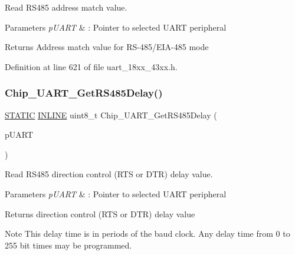 Read R\+S485 address match value. 


\begin{DoxyParams}{Parameters}
{\em p\+U\+A\+RT} & \+: Pointer to selected U\+A\+RT peripheral \\
\hline
\end{DoxyParams}
\begin{DoxyReturn}{Returns}
Address match value for R\+S-\/485/\+E\+I\+A-\/485 mode 
\end{DoxyReturn}


Definition at line 621 of file uart\+\_\+18xx\+\_\+43xx.\+h.

\mbox{\label{group___u_a_r_t__18_x_x__43_x_x_ga5394200f985c69d25fd0c7434588cf88}} 
\subsubsection{\texorpdfstring{Chip\+\_\+\+U\+A\+R\+T\+\_\+\+Get\+R\+S485\+Delay()}{Chip\_UART\_GetRS485Delay()}}
{\footnotesize\ttfamily \hyperlink{group___l_p_c___types___public___macros_ga10b2d890d871e1489bb02b7e70d9bdfb}{S\+T\+A\+T\+IC} \hyperlink{spifi__18xx__43xx_8h_a2eb6f9e0395b47b8d5e3eeae4fe0c116}{I\+N\+L\+I\+NE} uint8\+\_\+t Chip\+\_\+\+U\+A\+R\+T\+\_\+\+Get\+R\+S485\+Delay (\begin{DoxyParamCaption}\item[{\hyperlink{struct_l_p_c___u_s_a_r_t___t}{L\+P\+C\+\_\+\+U\+S\+A\+R\+T\+\_\+T} $\ast$}]{p\+U\+A\+RT }\end{DoxyParamCaption})}



Read R\+S485 direction control (R\+TS or D\+TR) delay value. 


\begin{DoxyParams}{Parameters}
{\em p\+U\+A\+RT} & \+: Pointer to selected U\+A\+RT peripheral \\
\hline
\end{DoxyParams}
\begin{DoxyReturn}{Returns}
direction control (R\+TS or D\+TR) delay value 
\end{DoxyReturn}
\begin{DoxyNote}{Note}
This delay time is in periods of the baud clock. Any delay time from 0 to 255 bit times may be programmed. 
\end{DoxyNote}


